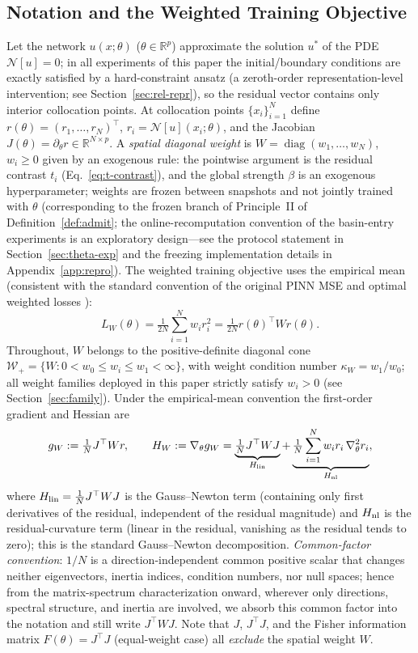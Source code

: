 \documentclass[11pt]{article}
\newcommand{\R}{\mathbb R}
\newcommand{\W}{W}
\DeclareMathOperator{\diag}{diag}
\numberwithin{equation}{section}
\begin{document}
\subsection{Notation and the Weighted Training Objective}\label{sec:notation}
Let the network $u(x;\theta)$ ($\theta\in\R^p$) approximate the solution $u^*$ of the PDE $\mathcal N[u]=0$; in all experiments of this paper the initial/boundary conditions are exactly satisfied by a hard-constraint ansatz (a zeroth-order representation-level intervention; see Section~\ref{sec:rel-repr}), so the residual vector contains only interior collocation points. At collocation points $\{x_i\}_{i=1}^{N}$ define $r(\theta)=(r_1,\dots,r_N)^\top$, $r_i=\mathcal N[u](x_i;\theta)$, and the Jacobian $J(\theta)=\partial_\theta r\in\R^{N\times p}$. A \emph{spatial diagonal weight} is $\W=\diag(w_1,\dots,w_N)$, $w_i\ge0$ given by an exogenous rule: the pointwise argument is the residual contrast $t_i$ (Eq.~\eqref{eq:t-contrast}), and the global strength $\beta$ is an exogenous hyperparameter; weights are frozen between snapshots and not jointly trained with $\theta$ (corresponding to the frozen branch of Principle~II of Definition~\ref{def:admit}; the online-recomputation convention of the basin-entry experiments is an exploratory design---see the protocol statement in Section~\ref{sec:theta-exp} and the freezing implementation details in Appendix~\ref{app:repro}). The weighted training objective uses the empirical mean (consistent with the standard convention of the original PINN MSE and optimal weighted losses \cite{Raissi2019,vanDerMeer2020}):
\begin{equation}\label{eq:lw}
L_{\W}(\theta)=\tfrac{1}{2N}\sum_{i=1}^{N}w_i r_i^2=\tfrac{1}{2N} r(\theta)^\top \W r(\theta).
\end{equation}
Throughout, $\W$ belongs to the positive-definite diagonal cone $\mathcal W_+=\{\W:0<w_0\le w_i\le w_1<\infty\}$, with weight condition number $\kappa_{\W}=w_1/w_0$; all weight families deployed in this paper strictly satisfy $w_i>0$ (see Section~\ref{sec:family}). Under the empirical-mean convention the first-order gradient and Hessian are
\begin{equation}\label{eq:h-split}
g_{\W}:=\tfrac1N J^\top\W r,\qquad
H_{\W}:=\nabla_\theta g_{\W}
=\underbrace{\tfrac1N J^\top\W J}_{H_{\rm lin}}
+\underbrace{\tfrac1N\sum_{i=1}^{N}w_i r_i\,\nabla_\theta^2 r_i}_{H_{\rm nl}} ,
\end{equation}
where $H_{\rm lin}=\tfrac1N J^\top\W J$ is the Gauss--Newton term (containing only first derivatives of the residual, independent of the residual magnitude) and $H_{\rm nl}$ is the residual-curvature term (linear in the residual, vanishing as the residual tends to zero); this is the standard Gauss--Newton decomposition. \emph{Common-factor convention}: $1/N$ is a direction-independent common positive scalar that changes neither eigenvectors, inertia indices, condition numbers, nor null spaces; hence from the matrix-spectrum characterization onward, wherever only directions, spectral structure, and inertia are involved, we absorb this common factor into the notation and still write $J^\top\W J$. Note that $J$, $J^\top J$, and the Fisher information matrix $F(\theta)=J^\top J$ (equal-weight case) all \emph{exclude} the spatial weight $\W$.
\end{document}
